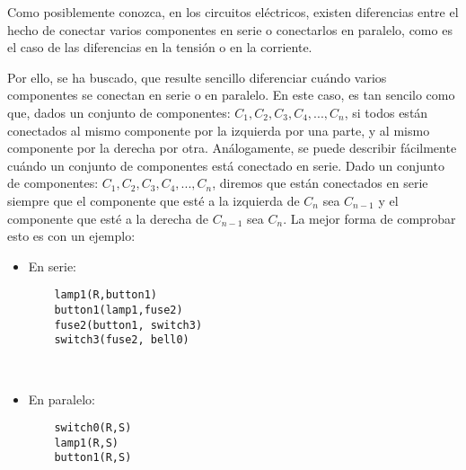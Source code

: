\documentclass{article}
\begin{document}
Como posiblemente conozca, en los circuitos eléctricos, existen diferencias entre el hecho de conectar varios componentes en serie o conectarlos en paralelo, como es el caso de las diferencias en la tensión o en la corriente.

Por ello, se ha buscado, que resulte sencillo diferenciar cuándo varios componentes se conectan en serie o en paralelo. En este caso, es tan sencilo como que, dados un conjunto de componentes: $C_1,C_2,C_3, C_4,...,C_n$, si todos están conectados al mismo componente por la izquierda por una parte, y al mismo componente por la derecha por otra. Análogamente, se puede describir fácilmente cuándo un conjunto de componentes está conectado en serie. Dado un conjunto de componentes: $C_1,C_2,C_3, C_4,...,C_n$, diremos que están conectados en serie siempre que el componente que esté a la izquierda de $C_{n}$ sea $C_{n-1}$ y el componente que esté a la derecha de $C_{n-1}$ sea $C_{n}$. La mejor forma de comprobar esto es con un ejemplo:

\begin{itemize}
  \item En serie:
  \begin{lstlisting}
    lamp1(R,button1)
    button1(lamp1,fuse2)
    fuse2(button1, switch3)
    switch3(fuse2, bell0)
  \end{lstlisting}

  \

  \item En paralelo:
  \begin{lstlisting}
    switch0(R,S)
    lamp1(R,S)
    button1(R,S)
  \end{lstlisting}

\end{itemize}
\end{document}
